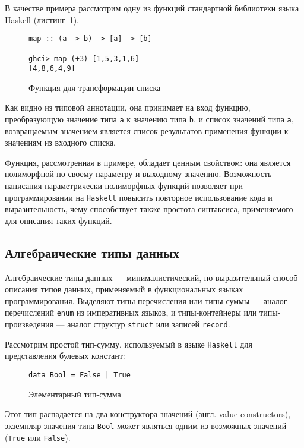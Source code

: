 В качестве примера рассмотрим одну из функций стандартной библиотеки языка 
Haskell (листинг~\ref{listing:map}).

\begin{figure}[h]
\begin{lstlisting}
map :: (a -> b) -> [a] -> [b]

ghci> map (+3) [1,5,3,1,6]
[4,8,6,4,9]
\end{lstlisting}
\caption{Функция для трансформации списка}
\label{listing:map}
\end{figure}

Как видно из типовой аннотации, она принимает на вход функцию, преобразующую 
значение типа \lstinline{a} к значению типа \lstinline{b}, и список значений 
типа \lstinline{a}, возвращаемым значением является список результатов 
применения функции к значениям из входного списка.

Функция, рассмотренная в примере, обладает ценным свойством: она является 
полиморфной по своему параметру и выходному значению. Возможность написания 
параметрически полиморфных функций позволяет при программировании на 
\lstinline{Haskell} повысить повторное использование кода и выразительность, 
чему способствует также простота синтаксиса, применяемого для описания таких 
функций.

\subsection{Алгебраические типы данных}

Алгебраические типы данных --- минималистический, но выразительный способ 
описания типов данных, применяемый в функциональных языках программирования. 
Выделяют типы-перечисления или типы-суммы --- аналог перечислений 
\lstinline{enum} из императивных языков, и типы-контейнеры или типы-произведения
 --- аналог структур \lstinline{struct} или записей \lstinline{record}.


Рассмотрим простой тип-сумму, используемый в языке \lstinline{Haskell} для 
представления булевых констант:

\begin{figure}[h]
\begin{lstlisting}
data Bool = False | True
\end{lstlisting}
\caption{Элементарный тип-сумма}
\label{listing:Bool}
\end{figure}

Этот тип распадается на два конструктора значений (англ. value constructors), 
экземпляр значения типа \lstinline{Bool} может являться одним из возможных 
значений (\lstinline{True} или \lstinline{False}).

